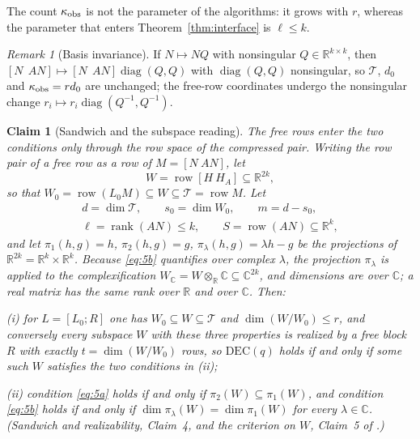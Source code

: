 ﻿\documentclass[journal]{IEEEtran}
\theoremstyle{plainn}
\newtheorem{claim}{Claim}
\theoremstyle{remark}
\newtheorem{remark}{Remark}
\begin{document}
The count $\kappa_{\rm obs}$ is not the parameter of the algorithms: it grows with $r$, whereas the
parameter that enters Theorem~\ref{thm:interface} is $\ell\le k$.

\begin{remark}[Basis invariance]
If $N\mapsto NQ$ with nonsingular $Q\in\mathbb R^{k\times k}$, then
$[N\ \ AN]\mapsto[N\ \ AN]\operatorname{diag}(Q,Q)$ with $\operatorname{diag}(Q,Q)$ nonsingular, so
$\mathcal T$, $d_0$ and $\kappa_{\rm obs}=rd_0$ are unchanged; the free-row coordinates undergo the
nonsingular change $r_i\mapsto r_i\operatorname{diag}(Q^{-1},Q^{-1})$.
\end{remark}

\begin{claim}[Sandwich and the subspace reading]\label{claim:sandwich}\label{claim:W}
The free rows enter the two conditions only through the row space of the compressed pair. Writing the
row pair of a free row as a row of $M=[N\ AN]$, let
\begin{equation*}
W=\operatorname{row}[H\ H_A]\subseteq\mathbb R^{2k},
\end{equation*}
so that $W_0=\operatorname{row}(L_0M)\subseteq W\subseteq\mathcal T=\operatorname{row}M$. Let
\begin{equation}\label{eq:ell}
\begin{gathered}
d=\dim\mathcal T,\qquad s_0=\dim W_0,\qquad m=d-s_0,\\
\ell=\operatorname{rank}(AN)\le k,\qquad S=\operatorname{row}(AN)\subseteq\mathbb R^k ,
\end{gathered}
\end{equation}
and let $\pi_1(h,g)=h$, $\pi_2(h,g)=g$, $\pi_\lambda(h,g)=\lambda h-g$ be the projections of
$\mathbb R^{2k}=\mathbb R^k\times\mathbb R^k$. Because \eqref{eq:5b} quantifies over complex
$\lambda$, the projection $\pi_\lambda$ is applied to the complexification
$W_{\mathbb C}=W\otimes_{\mathbb R}\mathbb C\subseteq\mathbb C^{2k}$, and dimensions are over
$\mathbb C$; a real matrix has the same rank over $\mathbb R$ and over $\mathbb C$. Then:

\emph{(i)} for $L=[L_0;R]$ one has $W_0\subseteq W\subseteq\mathcal T$ and $\dim(W/W_0)\le r$, and
conversely every subspace $W$ with these three properties is realized by a free block $R$ with exactly
$t=\dim(W/W_0)$ rows, so $\mathrm{DEC}(q)$ holds if and only if some such $W$ satisfies the two
conditions in (ii);

\emph{(ii)} condition \eqref{eq:5a} holds if and only if $\pi_2(W)\subseteq\pi_1(W)$, and condition
\eqref{eq:5b} holds if and only if $\dim\pi_\lambda(W)=\dim\pi_1(W)$ for every $\lambda\in\mathbb C$.
(Sandwich and realizability, Claim~4, and the criterion on $W$, Claim~5 of \cite{companion1}.)
\end{claim}
\end{document}
